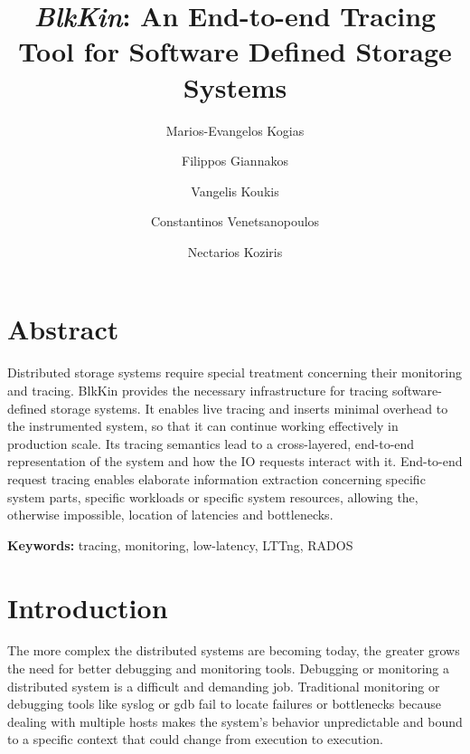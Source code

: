 \documentclass[a4paper,10pt,twocolumn]{article}
\begin{document}
\title{\emph{BlkKin}: An End-to-end Tracing Tool for Software Defined Storage 
Systems}
\author[1]{Marios-Evangelos Kogias}
\author[1]{Filippos Giannakos}
\author[1]{Vangelis Koukis}
\author[2]{Constantinos Venetsanopoulos}
\author[1]{Nectarios Koziris}
\date{}
\maketitle

\section*{Abstract}
Distributed storage systems require special treatment concerning their
monitoring and tracing. BlkKin provides the necessary infrastructure for tracing
software-defined storage systems. It enables live tracing and inserts minimal
overhead to the instrumented system, so that it can continue working effectively
in production scale. Its tracing semantics lead to a cross-layered, end-to-end
representation of the system and how the IO requests interact with it.
End-to-end request tracing enables elaborate information extraction concerning
specific system parts, specific workloads or specific system resources, allowing
the, otherwise impossible, location of latencies and bottlenecks. 

\textbf{Keywords: } tracing, monitoring, low-latency, LTTng, RADOS

\section{Introduction}

The more complex the distributed systems are becoming today, the greater grows
the need for better debugging and monitoring tools. Debugging or monitoring a
distributed system is a difficult and demanding job. Traditional monitoring or
debugging tools like syslog or gdb fail to locate failures or bottlenecks
because dealing with multiple hosts makes the system's behavior unpredictable
and bound to a specific context that could change from execution to execution.
\end{document}

